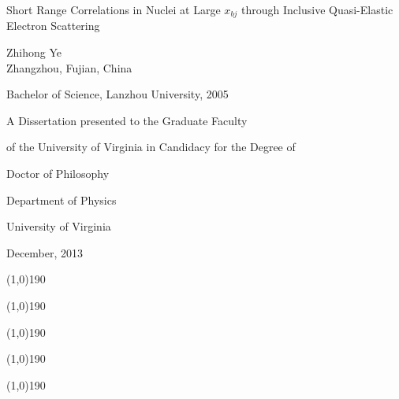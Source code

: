 \thispagestyle{empty}
\begin{center}

{\TitleFont Short Range Correlations in Nuclei at Large $x_{bj}$ through Inclusive Quasi-Elastic Electron Scattering}

\vspace{0.80in}

Zhihong Ye\\
Zhangzhou, Fujian, China


\vspace{0.5 in}
Bachelor of Science, Lanzhou University, 2005
\vspace{0.5 in}

{\small
A Dissertation presented to the Graduate Faculty

of the University of Virginia in Candidacy for the Degree of

Doctor of Philosophy

\vspace{0.35in}

Department of Physics

\vspace{0.35in}

University of Virginia

December, 2013
}

\vspace{0.5in}


\hfill \line(1,0){190}
\vspace{0.20in}

\hfill \line(1,0){190}
\vspace{0.20in}

\hfill \line(1,0){190}
\vspace{0.20in}

\hfill \line(1,0){190}
\vspace{0.20in}

\hfill \line(1,0){190}


\end{center}



